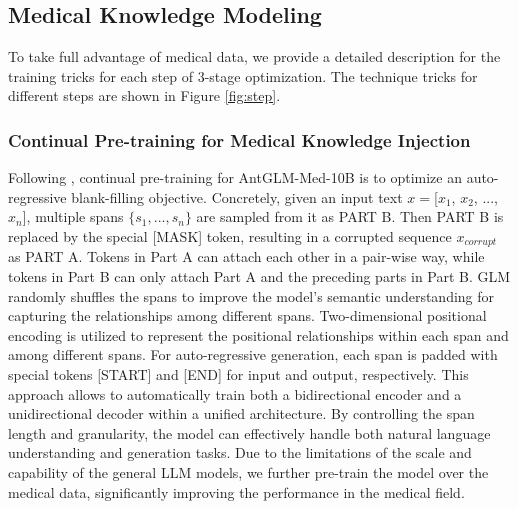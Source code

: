 \documentclass{article} %
\begin{document}






\subsection{Medical Knowledge Modeling}
\label{optimization_tricks}
To take full advantage of medical data, we provide a detailed description for the training tricks for each step of 3-stage optimization. The technique tricks for different steps are shown in Figure \ref{fig:step}.

\subsubsection{Continual Pre-training for Medical Knowledge Injection}
Following \cite{DBLP:conf/acl/DuQLDQY022}, continual pre-training for AntGLM-Med-10B is to optimize an auto-regressive blank-filling objective. Concretely, given an input text $x = $[$x_1$, $x_2$, ..., $x_n$], multiple spans $\{s_1, ..., s_n\}$ are sampled from it as PART B. Then PART B is replaced by the special [MASK] token, resulting in a corrupted sequence $x_{corrupt}$ as PART A. Tokens in Part A can attach each other in a pair-wise way, while tokens in Part B can only attach Part A and the preceding parts in Part B. GLM randomly shuffles the spans to improve the model's semantic understanding for capturing the relationships among different spans. Two-dimensional positional encoding is utilized to represent the positional relationships within each span and among different spans. For auto-regressive generation, each span is padded with special tokens [START] and [END] for input and output, respectively. This approach allows to automatically train both a bidirectional encoder and a unidirectional decoder within a unified architecture. By controlling the span length and granularity, the model can effectively handle both natural language understanding and generation tasks. Due to the limitations of the scale and capability of the general LLM models, we further pre-train the model over the medical data, significantly improving the performance in the medical field.
\end{document}
